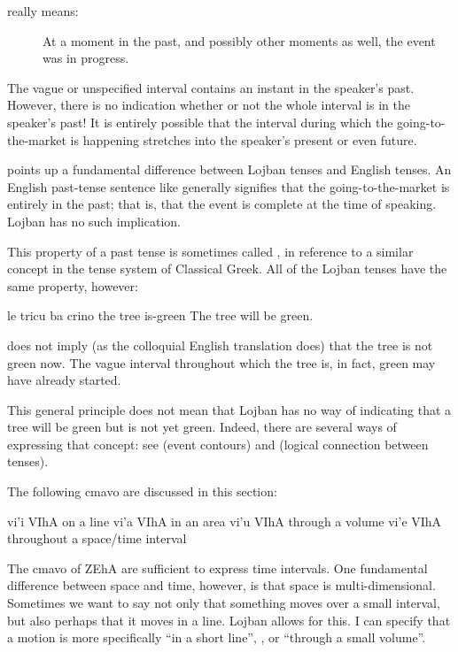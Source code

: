 {\noindent}really means: 
\begin{description}
\item[] At a moment in the past, and possibly other moments as well, the event  was in progress.
\end{description}

The vague or unspecified interval contains an instant in the
    speaker's past. However, there is no indication whether or not
    the whole interval is in the speaker's past! It is entirely
    possible that the interval during which the going-to-the-market
    is happening stretches into the speaker's present or even
    future. 

 points up a fundamental
    difference between Lojban tenses and English tenses. An English
    past-tense sentence like  generally
    signifies that the going-to-the-market is entirely in the past;
    that is, that the event is complete at the time of speaking.
    Lojban  has no such implication.

This property of a past tense is sometimes called
    , in reference to a similar concept in the tense
    system of Classical Greek. All of the Lojban tenses have the
    same property, however:
\begin{example}
le tricu ba crino\n
the tree  is-green\n
The tree will be green.
\end{example}

{\noindent}does not imply (as the colloquial English translation does)
    that the tree is not green now. The vague interval throughout
    which the tree is, in fact, green may have already started. 

This general principle does not mean that Lojban has no way
    of indicating that a tree will be green but is not yet green.
    Indeed, there are several ways of expressing that concept: see  (event contours) and  (logical connection between
    tenses).



The following cmavo are discussed in this section:

   vi'i    VIhA    on a line
    vi'a    VIhA    in an area
    vi'u    VIhA    through a volume
    vi'e    VIhA    throughout a space/time interval

The cmavo of ZEhA are sufficient to express time intervals. One
    fundamental difference between space and time, however, is that
    space is multi-dimensional. Sometimes we want to say not only
    that something moves over a small interval, but also perhaps
    that it moves in a line. Lojban allows for this. I can specify
    that a motion  is more specifically ``in a
    short line'', , or ``through a small
    volume''. 

